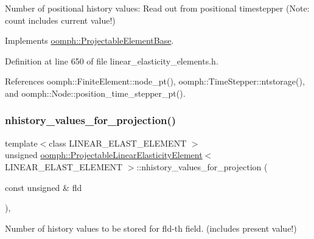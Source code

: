 Number of positional history values\+: Read out from positional timestepper (Note\+: count includes current value!) 



Implements \hyperlink{classoomph_1_1ProjectableElementBase_ab4ecd0cd24000a3ed675dc7198203c1f}{oomph\+::\+Projectable\+Element\+Base}.



Definition at line 650 of file linear\+\_\+elasticity\+\_\+elements.\+h.



References oomph\+::\+Finite\+Element\+::node\+\_\+pt(), oomph\+::\+Time\+Stepper\+::ntstorage(), and oomph\+::\+Node\+::position\+\_\+time\+\_\+stepper\+\_\+pt().

\mbox{\label{classoomph_1_1ProjectableLinearElasticityElement_a978036eab9ff96a4af083c9963f2f369}} 
\subsubsection{\texorpdfstring{nhistory\+\_\+values\+\_\+for\+\_\+projection()}{nhistory\_values\_for\_projection()}}
{\footnotesize\ttfamily template$<$class L\+I\+N\+E\+A\+R\+\_\+\+E\+L\+A\+S\+T\+\_\+\+E\+L\+E\+M\+E\+NT $>$ \\
unsigned \hyperlink{classoomph_1_1ProjectableLinearElasticityElement}{oomph\+::\+Projectable\+Linear\+Elasticity\+Element}$<$ L\+I\+N\+E\+A\+R\+\_\+\+E\+L\+A\+S\+T\+\_\+\+E\+L\+E\+M\+E\+NT $>$\+::nhistory\+\_\+values\+\_\+for\+\_\+projection (\begin{DoxyParamCaption}\item[{const unsigned \&}]{fld }\end{DoxyParamCaption})\hspace{0.3cm}{\ttfamily [inline]}, {\ttfamily [virtual]}}



Number of history values to be stored for fld-\/th field. (includes present value!) 



